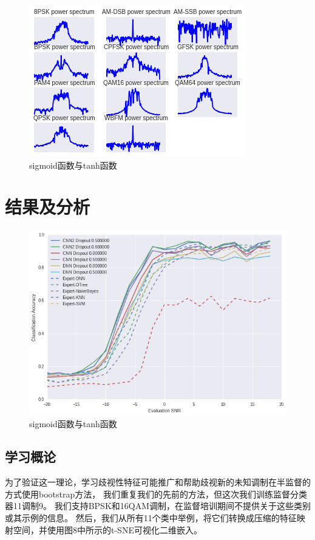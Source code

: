 \begin{figure}[!h]
	\centering
	\includegraphics[scale=0.9]{figures/chapter_3/signal_view_2}
	\caption{sigmoid函数与tanh函数}\label{fig_2_2}
\end{figure}


\section{结果及分析}

\begin{figure}[!h]
	\centering
	\includegraphics[scale=0.3]{figures/chapter_3/result}
	\caption{sigmoid函数与tanh函数}\label{fig_2_2}
\end{figure}

\subsection{学习概论}
为了验证这一理论，学习歧视性特征可能推广和帮助歧视新的未知调制在半监督的方式使用bootstrap方法，
我们重复我们的先前的方法，但这次我们训练监督分类器11调制9。
我们支持BPSK和16QAM调制，在监督培训期间不提供关于这些类别或其示例的信息。
然后，我们从所有11个类中举例，将它们转换成压缩的特征映射空间，并使用图8中所示的t-SNE可视化二维嵌入。\par

